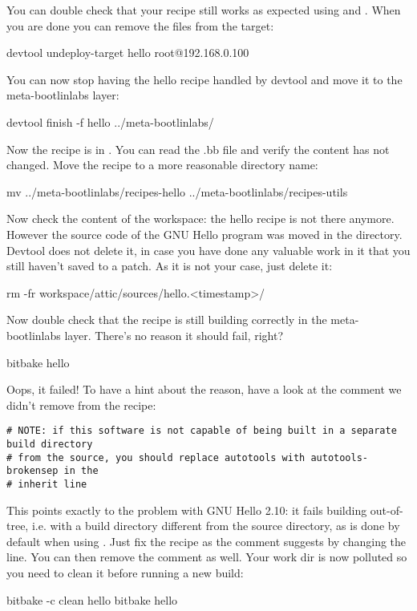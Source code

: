 You can double check that your recipe still works as expected using
 and .
When you are done you can remove the files from the target:
\begin{bashinput}
devtool undeploy-target hello root@192.168.0.100
\end{bashinput}

You can now stop having the hello recipe handled by devtool and move it to
the meta-bootlinlabs layer:
\begin{bashinput}
devtool finish -f hello ../meta-bootlinlabs/
\end{bashinput}

Now the recipe is in
. You can read
the .bb file and verify the content has not changed. Move the recipe to a
more reasonable directory name:
\begin{bashinput}
mv ../meta-bootlinlabs/recipes-hello ../meta-bootlinlabs/recipes-utils
\end{bashinput}

Now check the content of the workspace: the hello recipe is not there
anymore. However the source code of the GNU Hello program was moved in the
 directory. Devtool does not delete it, in
case you have done any valuable work in it that you still haven't saved to
a patch. As it is not your case, just delete it:
\begin{bashinput}
rm -fr workspace/attic/sources/hello.<timestamp>/
\end{bashinput}

Now double check that the recipe is still building correctly in the
meta-bootlinlabs layer. There's no reason it should fail, right?
\begin{bashinput}
bitbake hello
\end{bashinput}

Oops, it failed! To have a hint about the reason, have a look at the
comment we didn't remove from the recipe:
\begin{verbatim}
# NOTE: if this software is not capable of being built in a separate build directory
# from the source, you should replace autotools with autotools-brokensep in the
# inherit line
\end{verbatim}

This points exactly to the problem with GNU Hello 2.10: it fails building
out-of-tree, i.e. with a build directory different from the source
directory, as is done by default when using . Just
fix the recipe as the comment suggests by changing the 
line. You can then remove the comment as well. Your work dir is now
polluted so you need to clean it before running a new build:
\begin{bashinput}
bitbake -c clean hello
bitbake hello
\end{bashinput}

